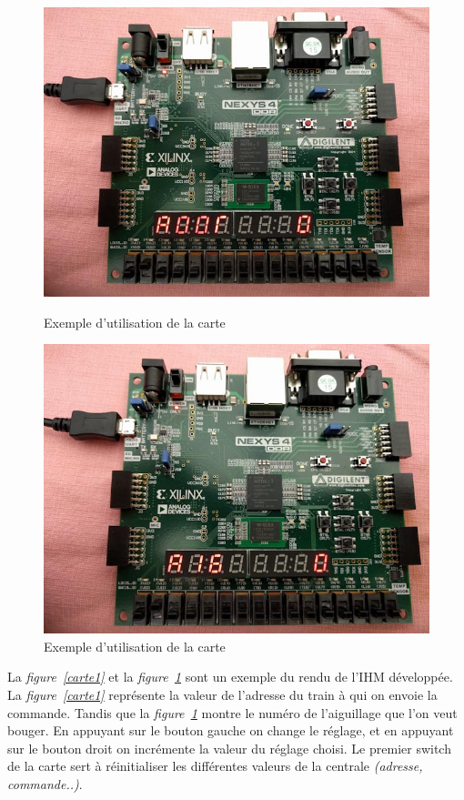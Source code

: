 \begin{figure}[h]
    \begin{minipage}[c]{.46\linewidth}
        \centering
        \includegraphics[scale=0.3]{exe_add.jpg}
        \caption{Exemple d'utilisation de la carte}
        \label{carte1}
    \end{minipage}
    \hfill%
    \begin{minipage}[c]{.46\linewidth}
        \centering
        \includegraphics[scale=0.3]{exe_aigui.jpg}
        \caption{Exemple d'utilisation de la carte}
        \label{carte2}
    \end{minipage}
\end{figure}

La \emph{figure~\ref{carte1}} et la \emph{figure~\ref{carte2}} sont un
exemple du rendu de l'IHM d\'evelopp\'ee.
La \emph{figure~\ref{carte1}} représente la valeur de l'adresse du
train à qui on envoie la commande.
Tandis que la \emph{figure~\ref{carte2}} montre le numéro de
l'aiguillage que l'on veut bouger.
En appuyant sur le bouton gauche on change le réglage, et en appuyant sur le
bouton droit on incrémente la valeur du réglage choisi.
Le premier switch de la carte sert à réinitialiser les différentes
valeurs de la centrale \emph{(adresse, commande..)}.

